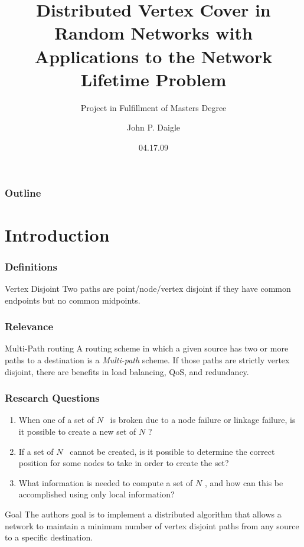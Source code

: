 \documentclass{beamer}
\title[Distributed MWVC in Random Graphs] %
{Distributed Vertex Cover in Random Networks with Applications to the Network Lifetime Problem}
\subtitle
{Project in Fulfillment of Masters Degree} %
\author[] %
{John P. Daigle}
\institute[Georgia State University] %
{
  Department of Computer Science\\
  Georgia State University}
\date[] %
{04.17.09}
\begin{document}
\begin{frame}
  \titlepage
\end{frame}

\begin{frame}
  \frametitle{Outline}
  \tableofcontents
\end{frame}

\section{Introduction}
\begin{frame}
  \frametitle{Definitions}
  \begin{block}{Vertex Disjoint}
    Two paths are point/node/vertex disjoint if they have common endpoints but no common midpoints.
  \end{block}
  \begin{center}
\end{center}
\end{frame}

\begin {frame}
  \frametitle{Relevance}
  \begin{block}{Multi-Path routing}
    A routing scheme in which a given source has two or more paths to a destination is a {\em Multi-path} scheme. If those paths are strictly vertex disjoint, there are benefits in load balancing, QoS, and redundancy.
  \end{block}
\end{frame}

\begin {frame}
  \frametitle{Research Questions}
  \begin{enumerate}
  \item When one of a set of $N$ \vdps\ is broken due to a node failure or linkage failure, is it possible to create a new set of $N$ \vdps ?
  \item If a set of $N$ \VDPs\ cannot be created, is it possible to determine the correct position for some nodes to take in order to create the set?
  \item What information is needed to compute a set of $N$ \VDPs, and how can this be accomplished using only local information?
  \end{enumerate}

  \begin{block}{Goal}
    The authors goal is to implement a distributed algorithm that allows a network to maintain a minimum number of vertex disjoint paths from any source to a specific destination.
  \end{block}
\end{frame}
\end{document}
